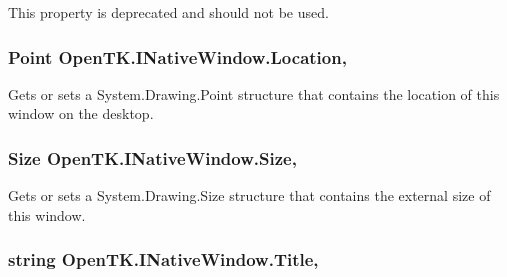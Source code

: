 This property is deprecated and should not be used. 

\hypertarget{interface_open_t_k_1_1_i_native_window_adb40bbbb862af25e3f05dd6bc20ae0c2}{
\subsubsection[{Location}]{\setlength{\rightskip}{0pt plus 5cm}Point Open\-T\-K.\-I\-Native\-Window.\-Location\hspace{0.3cm}{\ttfamily [get]}, {\ttfamily [set]}}}\label{interface_open_t_k_1_1_i_native_window_adb40bbbb862af25e3f05dd6bc20ae0c2}


Gets or sets a System.\-Drawing.\-Point structure that contains the location of this window on the desktop. 

\hypertarget{interface_open_t_k_1_1_i_native_window_a987289178e2f63ce7eaf58d9cbe72ed5}{
\subsubsection[{Size}]{\setlength{\rightskip}{0pt plus 5cm}Size Open\-T\-K.\-I\-Native\-Window.\-Size\hspace{0.3cm}{\ttfamily [get]}, {\ttfamily [set]}}}\label{interface_open_t_k_1_1_i_native_window_a987289178e2f63ce7eaf58d9cbe72ed5}


Gets or sets a System.\-Drawing.\-Size structure that contains the external size of this window. 

\hypertarget{interface_open_t_k_1_1_i_native_window_acc6e79eb06f9e7d725f6eac5ac1df71d}{
\subsubsection[{Title}]{\setlength{\rightskip}{0pt plus 5cm}string Open\-T\-K.\-I\-Native\-Window.\-Title\hspace{0.3cm}{\ttfamily [get]}, {\ttfamily [set]}}}\label{interface_open_t_k_1_1_i_native_window_acc6e79eb06f9e7d725f6eac5ac1df71d}



